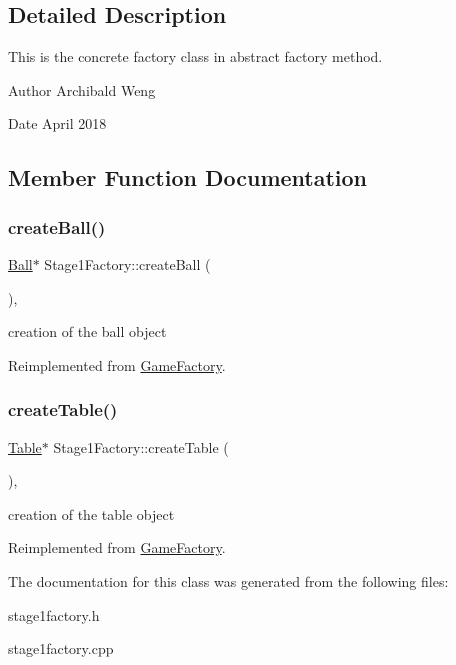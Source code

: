 \subsection{Detailed Description}
This is the concrete factory class in abstract factory method. 

\begin{DoxyAuthor}{Author}
Archibald Weng 
\end{DoxyAuthor}
\begin{DoxyDate}{Date}
April 2018 
\end{DoxyDate}


\subsection{Member Function Documentation}
\mbox{\label{class_stage1_factory_a84b6d3dc3f6500cdc128bb553dacd4cc}} 
\subsubsection{\texorpdfstring{create\+Ball()}{createBall()}}
{\footnotesize\ttfamily \mbox{\hyperlink{class_ball}{Ball}}$\ast$ Stage1\+Factory\+::create\+Ball (\begin{DoxyParamCaption}{ }\end{DoxyParamCaption})\hspace{0.3cm}{\ttfamily [inline]}, {\ttfamily [virtual]}}

creation of the ball object 

Reimplemented from \mbox{\hyperlink{class_game_factory_aae6fcb1b85abc73e3370246fdf77b7a8}{Game\+Factory}}.

\mbox{\label{class_stage1_factory_ad1a070c87d52b00654125bd9f439cf26}} 
\subsubsection{\texorpdfstring{create\+Table()}{createTable()}}
{\footnotesize\ttfamily \mbox{\hyperlink{class_table}{Table}}$\ast$ Stage1\+Factory\+::create\+Table (\begin{DoxyParamCaption}{ }\end{DoxyParamCaption})\hspace{0.3cm}{\ttfamily [inline]}, {\ttfamily [virtual]}}

creation of the table object 

Reimplemented from \mbox{\hyperlink{class_game_factory_ac2e32aa1f1c55aae847745575afb0583}{Game\+Factory}}.



The documentation for this class was generated from the following files\+:\begin{DoxyCompactItemize}
\item 
stage1factory.\+h\item 
stage1factory.\+cpp\end{DoxyCompactItemize}
